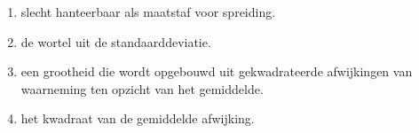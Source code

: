 \begin{enumerate}[label=(\alph*)]
    \item slecht hanteerbaar als maatstaf voor spreiding.
    \item de wortel uit de standaarddeviatie.
    \item een grootheid die wordt opgebouwd uit gekwadrateerde afwijkingen van waarneming ten opzicht van het gemiddelde.
    \item het kwadraat van de gemiddelde afwijking.
\end{enumerate}
